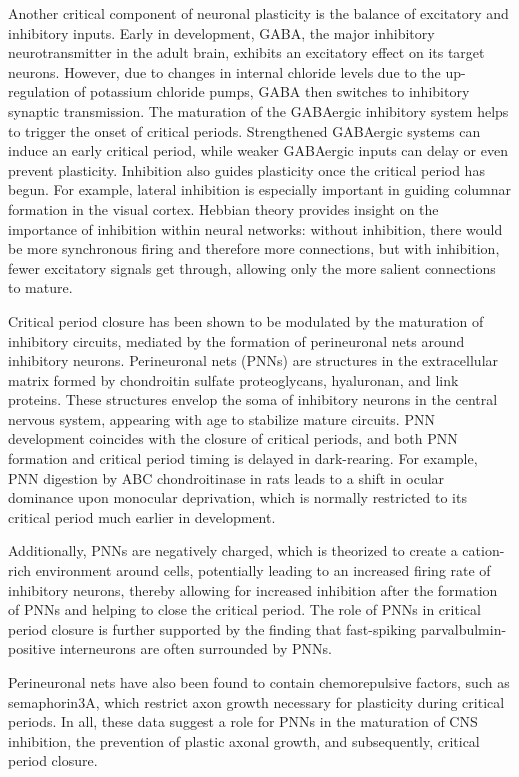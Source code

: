 Another critical component of neuronal plasticity is the balance of excitatory and inhibitory inputs. Early in development, GABA, the major inhibitory neurotransmitter in the adult brain, exhibits an excitatory effect on its target neurons. However, due to changes in internal chloride levels due to the up-regulation of potassium chloride pumps, GABA then switches to inhibitory synaptic transmission. The maturation of the GABAergic inhibitory system helps to trigger the onset of critical periods. Strengthened GABAergic systems can induce an early critical period, while weaker GABAergic inputs can delay or even prevent plasticity. Inhibition also guides plasticity once the critical period has begun. For example, lateral inhibition is especially important in guiding columnar formation in the visual cortex. Hebbian theory provides insight on the importance of inhibition within neural networks: without inhibition, there would be more synchronous firing and therefore more connections, but with inhibition, fewer excitatory signals get through, allowing only the more salient connections to mature.

Critical period closure has been shown to be modulated by the maturation of inhibitory circuits, mediated by the formation of perineuronal nets around inhibitory neurons. Perineuronal nets (PNNs) are structures in the extracellular matrix formed by chondroitin sulfate proteoglycans, hyaluronan, and link proteins. These structures envelop the soma of inhibitory neurons in the central nervous system, appearing with age to stabilize mature circuits. PNN development coincides with the closure of critical periods, and both PNN formation and critical period timing is delayed in dark-rearing. For example, PNN digestion by ABC chondroitinase in rats leads to a shift in ocular dominance upon monocular deprivation, which is normally restricted to its critical period much earlier in development.

Additionally, PNNs are negatively charged, which is theorized to create a cation-rich environment around cells, potentially leading to an increased firing rate of inhibitory neurons, thereby allowing for increased inhibition after the formation of PNNs and helping to close the critical period. The role of PNNs in critical period closure is further supported by the finding that fast-spiking parvalbulmin-positive interneurons are often surrounded by PNNs.

Perineuronal nets have also been found to contain chemorepulsive factors, such as semaphorin3A, which restrict axon growth necessary for plasticity during critical periods. In all, these data suggest a role for PNNs in the maturation of CNS inhibition, the prevention of plastic axonal growth, and subsequently, critical period closure.

